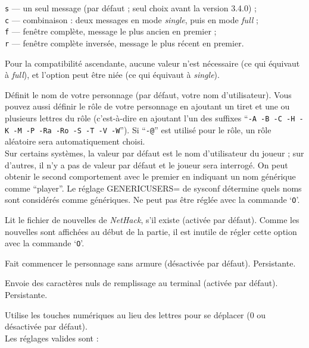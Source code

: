 \documentclass[titlepage]{article}
\begin{document}
\begin{description}[font=\mdseries\itshape]
\texttt{s} --- un seul message (par défaut ; seul choix avant la version 3.4.0) ;\\
\texttt{c} --- combinaison : deux messages en mode \textit{single}, puis en mode \textit{full} ;\\
\texttt{f} --- fenêtre complète, message le plus ancien en premier ;\\
\texttt{r} --- fenêtre complète inversée, message le plus récent en premier.

Pour la compatibilité ascendante, aucune valeur n'est nécessaire (ce qui
équivaut à \textit{full}), et l'option peut être niée (ce qui équivaut
à \textit{single}).
\item[name]
Définit le nom de votre personnage (par défaut, votre nom d'utilisateur). Vous pouvez aussi
définir le rôle de votre personnage en ajoutant un tiret et une ou plusieurs lettres du
rôle (c'est-à-dire en ajoutant l'un des suffixes
``\texttt{-A -B -C -H -K -M -P -Ra -Ro -S -T -V -W}'').
Si ``\texttt{-@}'' est utilisé pour le rôle, un rôle aléatoire sera
automatiquement choisi.
\\
Sur certains systèmes, la valeur par défaut est le nom d'utilisateur du joueur ;
sur d'autres, il n'y a pas de valeur par défaut et le joueur sera interrogé.
On peut obtenir le second comportement avec le premier en indiquant un nom générique
comme ``player''. Le réglage GENERICUSERS= de sysconf détermine quels
noms sont considérés comme génériques.
Ne peut pas être réglée avec la commande `\texttt{O}'.
\item[news]
Lit le fichier de nouvelles de \textit{NetHack}, s'il existe (activée par défaut).
Comme les nouvelles sont affichées au début de la partie, il est inutile
de régler cette option avec la commande `\texttt{O}'.
\item[nudist]
Fait commencer le personnage sans armure (désactivée par défaut). Persistante.
\item[null]
Envoie des caractères nuls de remplissage au terminal (activée par défaut). Persistante.
\item[number\textunderscore pad]
Utilise les touches numériques au lieu des lettres pour se déplacer (0 ou désactivée par défaut).\\
Les réglages valides sont :


\end{description}
\end{document}
